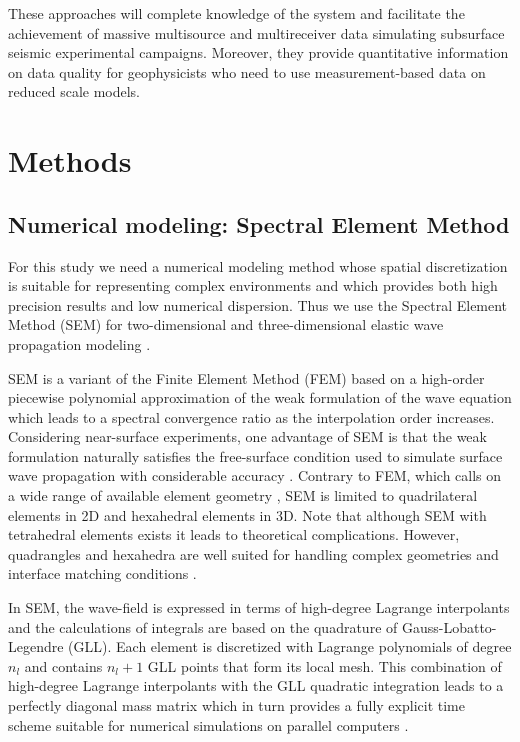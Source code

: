\documentclass[manuscript,revised]{geophysics}
\begin{document}
\noindent These approaches will complete knowledge of the system and facilitate the achievement of massive multisource and multireceiver data simulating subsurface seismic experimental campaigns. Moreover, they provide quantitative information on data quality for geophysicists who need to use measurement-based data on reduced scale models. 

\section{Methods}

\subsection{Numerical modeling: Spectral Element Method}

\noindent For this study we need a numerical modeling method whose spatial discretization is suitable for representing complex environments and which provides both high precision results and low numerical dispersion. Thus we use the Spectral Element Method (SEM) for two-dimensional and three-dimensional elastic wave propagation modeling \citep{Komatitsch_SEM_1998,Komatitsch_ISM_1999,Komatitsch_SEM_2005,Festa_PML_2005}. 

\noindent SEM is a variant of the Finite Element Method (FEM) \citep{Lysmer_FEM_1972,Seron_FEM_1990,Hulbert_FEM_1990,Tromp_SEM_2008} based on a high-order piecewise polynomial approximation of the weak formulation of the wave equation which leads to a spectral convergence ratio as the interpolation order increases. Considering near-surface experiments, one advantage of SEM is that the weak formulation naturally satisfies the free-surface condition used to simulate surface wave propagation with considerable accuracy \citep{komatitsch1998spectral,komatitsch1999spectral,Komatitsch_SEM_2005}. Contrary to FEM, which calls on a wide range of available element geometry \citep{dhatt1984finite}, SEM is limited to quadrilateral elements in 2D and hexahedral elements in 3D. Note that although SEM with tetrahedral elements exists \citep{komatitsch2001wave} it leads to theoretical complications. However, quadrangles and hexahedra are well suited for handling complex geometries and interface matching conditions \citep{Cristini_SEM_2012}. 

\noindent In SEM, the wave-field is expressed in terms of high-degree Lagrange interpolants and the calculations of integrals are based on the quadrature of Gauss-Lobatto-Legendre (GLL). Each element is discretized with Lagrange polynomials of degree $n_{l}$ and contains $n_{l}+1$ GLL points that form its local mesh. This combination of high-degree Lagrange interpolants with the GLL quadratic integration leads to a perfectly diagonal mass matrix which in turn provides a fully explicit time scheme suitable for numerical simulations on parallel computers \citep{komatitsch1998spectral,komatitsch1999spectral}.
\end{document}
